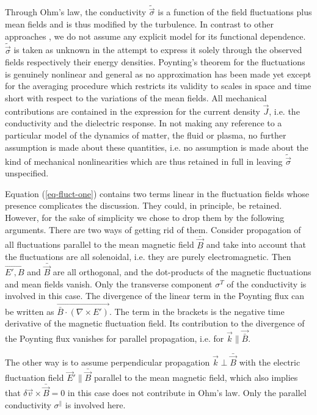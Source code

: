 \documentclass[ ]{copernicus2}
\begin{document}
{Through Ohm's law, the conductivity $\tilde{\vec{\sigma}}$ is a function of the field fluctuations plus mean fields and is thus modified by the turbulence. In contrast to other approaches \citep[cf., e.g.,][and others]{zank2012}, we do not assume any explicit model for its functional dependence. $\tilde{\vec{\sigma}}$ is taken as unknown in the attempt to express it solely through the observed fields respectively their energy densities.
Poynting's theorem for the fluctuations is genuinely nonlinear and general as no approximation has been made yet except for the averaging procedure {which restricts its validity to scales in space and time short with respect to the variations of the mean fields}.  All mechanical contributions are contained in the expression for the current density $\vec{J}$, i.e. the conductivity and the dielectric response. {In not making any reference to a particular model of the dynamics of matter, the fluid or plasma, no further assumption is made about these quantities, i.e. no assumption is made about the kind of mechanical nonlinearities which are thus retained in full in leaving $\tilde{\vec\sigma}$ unspecified.} 

Equation (\ref{eq-fluct-one}) contains two terms linear in the fluctuation fields whose presence complicates the discussion. They could, in principle, be retained. However, for the sake of simplicity we chose to drop them by the following arguments.
There are two ways of getting rid of them. Consider propagation of all fluctuations parallel to the mean magnetic field $\bar{\vec{B}}$ and take into account that the fluctuations are all solenoidal{, i.e. they are purely electromagnetic}. Then $\vec{E', B}$ and $\bar{\vec{B}}$ are all orthogonal, and the dot-products of the magnetic fluctuations and mean fields vanish. {Only the transverse component $\sigma^T$ of the conductivity is involved in this case. The divergence of the linear term in the Poynting flux can be written as $\vec{\bar{B}\cdot(\nabla\times E')}$. The term in the brackets is the negative time derivative of the magnetic fluctuation field. Its contribution to the divergence of the Poynting flux vanishes for parallel propagation, i.e. for $\vec{k}\|\vec{\bar{B}}$.} 

{The other way is to assume perpendicular propagation $\vec{k}\perp\bar{\vec{B}}$ with the electric fluctuation field $\vec{E}'\|\bar{\vec{B}}$ parallel to the mean magnetic field, which also implies that $\delta\vec{v}\times\bar{\vec{B}}=0$ in this case does not contribute in Ohm's law. Only the parallel conductivity $\sigma^\|$ is involved here.}

}
\end{document}
